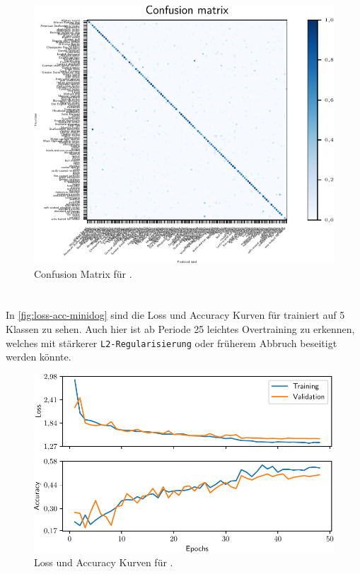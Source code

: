 \begin{figure}
  \centering
  \includegraphics[scale=0.8]{pics/ergebnisse/PreBigDogNN/confusion_matrix.pdf}
  \caption{Confusion Matrix für \PreBig.}
  \label{fig:confusion-prebig}
\end{figure}

\section{\MiniDog}

In \autoref{fig:loss-acc-minidog} sind die Loss und Accuracy Kurven für \MiniDog
trainiert auf 5 Klassen zu sehen. Auch hier ist ab Periode 25 leichtes
Overtraining zu erkennen, welches mit stärkerer \texttt{L2-Regularisierung} oder
früherem Abbruch beseitigt werden könnte.

\begin{figure}
  \centering
  \includegraphics[scale=0.8]{pics/ergebnisse/MiniDogNN/history.pdf}
  \caption{Loss und Accuracy Kurven für \MiniDog.}
  \label{fig:loss-acc-minidog}
\end{figure}

